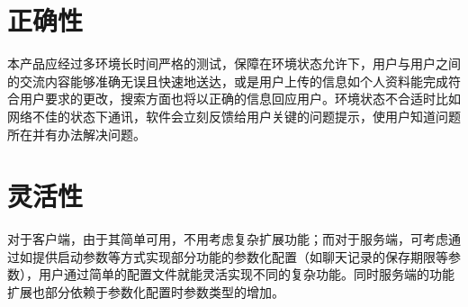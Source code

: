 \section{正确性}
本产品应经过多环境长时间严格的测试，保障在环境状态允许下，用户与用户之间的交流内容能够准确无误且快速地送达，或是用户上传的信息如个人资料能完成符合用户要求的更改，搜索方面也将以正确的信息回应用户。环境状态不合适时比如网络不佳的状态下通讯，软件会立刻反馈给用户关键的问题提示，使用户知道问题所在并有办法解决问题。

\section{灵活性}
对于客户端，由于其简单可用，不用考虑复杂扩展功能；而对于服务端，可考虑通过如提供启动参数等方式实现部分功能的参数化配置（如聊天记录的保存期限等参数），用户通过简单的配置文件就能灵活实现不同的复杂功能。同时服务端的功能扩展也部分依赖于参数化配置时参数类型的增加。







